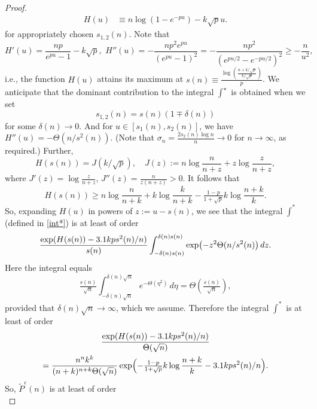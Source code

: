 \documentclass[11pt]{amsart}
\theoremstyle{remark}
\numberwithin{equation}{section}
\begin{document}
\begin{proof}
\begin{equation}
\begin{aligned}
 H(u)& \equiv n\log (1 - e^{-pu})-k\sqrt{p}u.
\end{aligned}
\end{equation}
for appropriately chosen $s_{1,2}(n)$. Note that
\begin{equation*}
H'(u)=\frac{np}{e^{pu}-1}-k\sqrt{p},\,\, H''(u)=-\frac{np^2e^{pu}}{(e^{pu}-1)^2}
=-\frac{np^2}{(e^{pu/2}-e^{-pu/2})^2}\ge-\frac{n}{u^2},
\end{equation*}
i.e., the function $H(u)$ attains its maximum at 
$s(n) \equiv \frac{\log \left(\frac{n+k/\sqrt{p}}{k/\sqrt{p}}\right)}{p}$.
We anticipate that the dominant contribution to the integral $\int^\star$ is obtained when we set  
\begin{equation*}
 s_{1,2}(n)=s(n)(1\mp\delta(n))
\end{equation*}
for some $\delta(n) \to 0$. And for $u\in [s_1(n),s_2(n)]$, we have $H''(u)=-\Theta(n/s^2(n))$. (Note that $\sigma_n=\frac{2s_2(n)\log n}{n}\to 0$ for $n \to \infty$, as required.) Further, 
\begin{equation*}
H(s(n))=J(k/\sqrt{p}), \quad J(z):=n\log\frac{n}{n+z}+z\log\frac{z}{n+z},
\end{equation*}
where $J'(z)=\log\tfrac{z}{n+z}$, $J''(z)=\tfrac{n}{z(n+z)}>0$. It follows that 
\begin{equation*}
H(s(n))\ge n\log\frac{n}{n+k}+k\log\frac{k}{n+k}-\tfrac{1-p}{1+\sqrt{p}}k\log\frac{n+k}{k}.
\end{equation*}
So, expanding $H(u)$ in powers of $z:=u-s(n)$, we see that the integral $\int^*$ (defined in \eqref{int*}) is at least of order
\[
\frac{\exp(H(s(n))-3.1kps^2(n)/n)}{s(n)}\int_{-\delta(n)s(n)}^{\delta(n)s(n)}\exp\bigl(-z^2\Theta(n/s^2(n)\bigr)\,dz.\\
\]
Here the integral equals
\[
\tfrac{s(n)}{\sqrt{n}}\int_{-\delta(n)\sqrt{n}}^{\delta(n)\sqrt{n}}e^{-\Theta(\eta^2)}\,d\eta=\Theta(\tfrac{s(n)}{\sqrt{n}}),
\]
provided that $\delta (n)\sqrt{n}\to\infty$, which we assume. Therefore the integral $\int^*$ is at least of order
\begin{multline*}
\frac{\exp(H(s(n))-3.1kps^2(n)/n)}{\Theta(\sqrt{n})}\\
=\frac{n^n k^k}{(n+k)^{n+k}\Theta(\sqrt{n})}\exp\Bigl(-\tfrac{1-p}{1+\sqrt{p}}k\log\frac{n+k}{k}-3.1kps^2(n)/n\Bigr).
\end{multline*}
So, $\tilde{P}^\epsilon(n)$ is at least of order 
\begin{equation*}

\end{equation*}
\end{proof}
\end{document}

